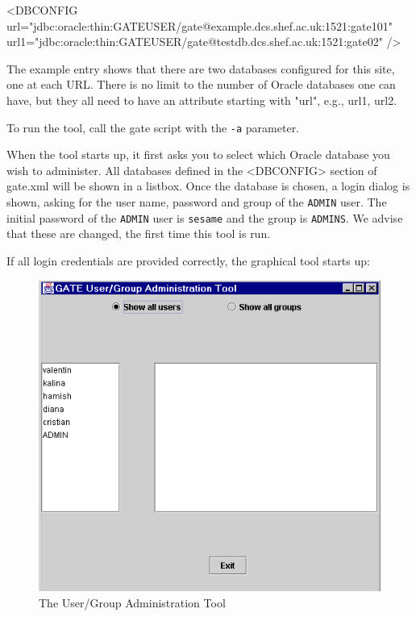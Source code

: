 <DBCONFIG
  url="jdbc:oracle:thin:GATEUSER/gate@example.dcs.shef.ac.uk:1521:gate101"
  url1="jdbc:oracle:thin:GATEUSER/gate@testdb.dcs.shef.ac.uk:1521:gate02"
/>

The example entry shows that there are two databases configured
for this site, one at each URL. There is no limit to the number of
Oracle databases one can have, but they all need to have an
attribute starting with "url", e.g., url1, url2.

To run the tool, call the gate script with the {\tt -a} parameter.

When the tool starts up, it first asks you to select which Oracle
database you wish to administer. All databases defined in the
<DBCONFIG> section of gate.xml will be shown in a listbox. Once
the database is chosen, a login dialog is shown, asking for the
user name, password and group of the {\tt ADMIN} user. The initial
password of the {\tt ADMIN} user is {\tt sesame} and the group is
{\tt ADMINS}. We advise that these are changed, the first time
this tool is run.

If all login credentials are provided correctly, the graphical tool
starts up:
%
\begin{figure}[htbp]
\begin{center}
\includegraphics[scale=0.5]{user-group-tool-gui.png}
\end{center}
\caption{The User/Group Administration Tool}
\label{fig:user_group_tool_gui}
\end{figure}
%


